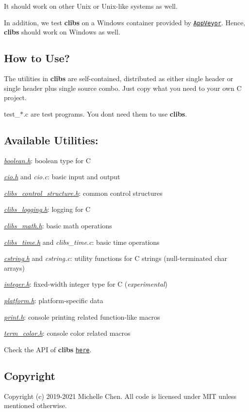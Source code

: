 It should work on other Unix or Unix-\/like systems as well.

In addition, we test {\bfseries clibs} on a Windows container provided by \href{https://www.appveyor.com/}{\tt App\+Veyor}. Hence, {\bfseries clibs} should work on Windows as well.

\subsection*{How to Use?}

The utilities in {\bfseries clibs} are self-\/contained, distributed as either single header or single header plus single source combo. Just copy what you need to your own C project.

test\+\_\+$\ast$.c are test programs. You don\textquotesingle{}t need them to use {\bfseries clibs}.

\subsection*{Available Utilities\+:}


\begin{DoxyItemize}
\item {\itshape \hyperlink{boolean_8h}{boolean.\+h}}\+: boolean type for C
\item {\itshape \hyperlink{cio_8h}{cio.\+h}} and {\itshape cio.\+c}\+: basic input and output
\item {\itshape \hyperlink{clibs__control__structure_8h}{clibs\+\_\+control\+\_\+structure.\+h}}\+: common control structures
\item {\itshape \hyperlink{clibs__logging_8h}{clibs\+\_\+logging.\+h}}\+: logging for C
\item {\itshape \hyperlink{clibs__math_8h}{clibs\+\_\+math.\+h}}\+: basic math operations
\item {\itshape \hyperlink{clibs__time_8h}{clibs\+\_\+time.\+h}} and {\itshape clibs\+\_\+time.\+c}\+: basic time operations
\item {\itshape \hyperlink{cstring_8h}{cstring.\+h}} and {\itshape cstring.\+c}\+: utility functions for C strings (null-\/terminated {\ttfamily char} arrays)
\item {\itshape \hyperlink{integer_8h}{integer.\+h}}\+: fixed-\/width integer type for C ({\itshape experimental})
\item {\itshape \hyperlink{platform_8h}{platform.\+h}}\+: platform-\/specific data
\item {\itshape \hyperlink{print_8h}{print.\+h}}\+: console printing related function-\/like macros
\item {\itshape \hyperlink{term__color_8h}{term\+\_\+color.\+h}}\+: console color related macros
\end{DoxyItemize}

Check the A\+PI of {\bfseries clibs} \href{https://cwchentw.github.io/clibs/html/index.html}{\tt here}.

\subsection*{Copyright}

Copyright (c) 2019-\/2021 Michelle Chen. All code is licensed under M\+IT unless mentioned otherwise. 
